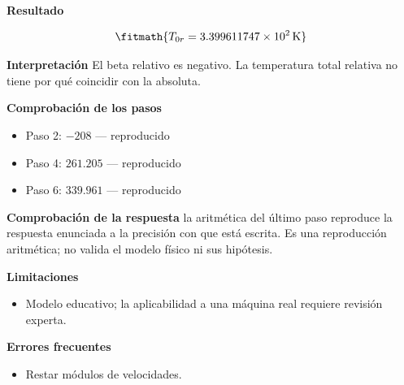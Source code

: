 \documentclass[10pt,openany]{book}
\begin{document}
\begin{tcolorbox}[title={Problema resuelto 2}, studiumworked, breakable]
\noindent\textbf{Resultado}

\[
\fitmath{T_{0r}=3.399611747\times10^{2}\,\mathrm{K}}
\]

\noindent\textbf{Interpretación}
El beta relativo es negativo. La temperatura total relativa no tiene por qué coincidir con la absoluta.

\noindent\textbf{Comprobación de los pasos}
\begin{itemize}
\item Paso 2: $-208$ — reproducido
\item Paso 4: $261.205$ — reproducido
\item Paso 6: $339.961$ — reproducido
\end{itemize}

\noindent\textbf{Comprobación de la respuesta} la aritmética del último paso reproduce la respuesta enunciada a la precisión con que está escrita. Es una reproducción aritmética; no valida el modelo físico ni sus hipótesis.

\noindent\textbf{Limitaciones}
\begin{itemize}
\item Modelo educativo; la aplicabilidad a una máquina real requiere revisión experta.
\end{itemize}

\noindent\textbf{Errores frecuentes}
\begin{itemize}
\item Restar módulos de velocidades.
\end{itemize}
\end{tcolorbox}
\end{document}
